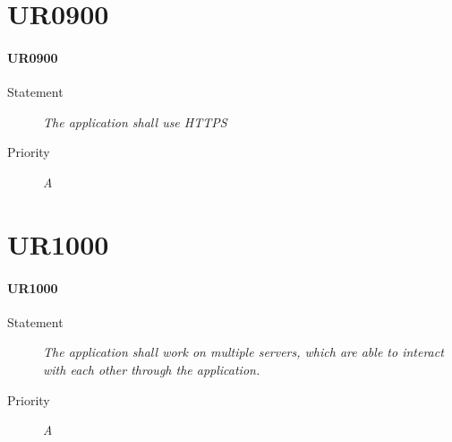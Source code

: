 \section{UR0900}

\paragraph{UR0900}
\begin{description}
\item [Statement] \textit{
The application shall use \gls{HTTPS}
}
\item [Priority] \textit{A}
\end{description}

\section{UR1000}

\paragraph{UR1000}
\begin{description}
\item [Statement] \textit{
The application shall work on multiple servers, which are able to interact with each other through the application.
}
\item [Priority] \textit{A}
\end{description}